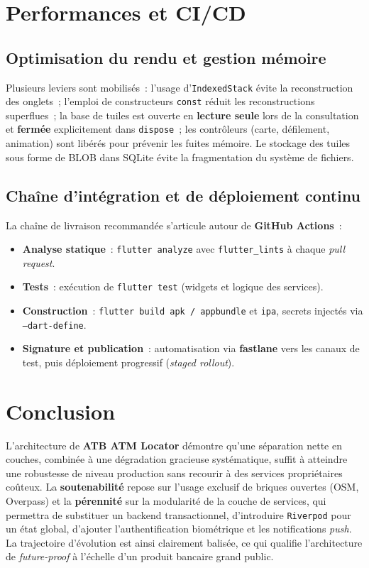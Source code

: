 \documentclass[11pt,a4paper]{article}
\newcommand{\code}[1]{\texttt{#1}}
\begin{document}
\section{Performances et CI/CD}
\subsection{Optimisation du rendu et gestion m\'emoire}
Plusieurs leviers sont mobilis\'es~: l'usage d'\code{IndexedStack} \'evite la
reconstruction des onglets~; l'emploi de constructeurs \code{const} r\'eduit les
reconstructions superflues~; la base de tuiles est ouverte en \textbf{lecture
seule} lors de la consultation et \textbf{ferm\'ee} explicitement dans
\code{dispose}~; les contr\^oleurs (carte, d\'efilement, animation) sont
lib\'er\'es pour pr\'evenir les fuites m\'emoire. Le stockage des tuiles sous
forme de BLOB dans SQLite \'evite la fragmentation du syst\`eme de fichiers.

\subsection{Cha\^ine d'int\'egration et de d\'eploiement continu}
La cha\^ine de livraison recommand\'ee s'articule autour de \textbf{GitHub
Actions}~:
\begin{itemize}[leftmargin=1.4em]
  \item \textbf{Analyse statique}~: \code{flutter analyze} avec
  \code{flutter\_lints} \`a chaque \emph{pull request}.
  \item \textbf{Tests}~: ex\'ecution de \code{flutter test} (widgets et logique
  des services).
  \item \textbf{Construction}~: \code{flutter build apk\,/\,appbundle} et
  \code{ipa}, secrets inject\'es via \code{--dart-define}.
  \item \textbf{Signature et publication}~: automatisation via \textbf{fastlane}
  vers les canaux de test, puis d\'eploiement progressif (\emph{staged
  rollout}).
\end{itemize}

\section{Conclusion}
L'architecture de \textbf{ATB ATM Locator} d\'emontre qu'une s\'eparation nette
en couches, combin\'ee \`a une d\'egradation gracieuse syst\'ematique, suffit \`a
atteindre une robustesse de niveau production sans recourir \`a des services
propri\'etaires co\^uteux. La \textbf{soutenabilit\'e} repose sur l'usage
exclusif de briques ouvertes (OSM, Overpass) et la \textbf{p\'erennit\'e} sur la
modularit\'e de la couche de services, qui permettra de substituer un backend
transactionnel, d'introduire \code{Riverpod} pour un \'etat global,
d'ajouter l'authentification biom\'etrique et les notifications \emph{push}.
La trajectoire d'\'evolution est ainsi clairement balis\'ee, ce qui qualifie
l'architecture de \emph{future-proof} \`a l'\'echelle d'un produit bancaire
grand public.
\end{document}
